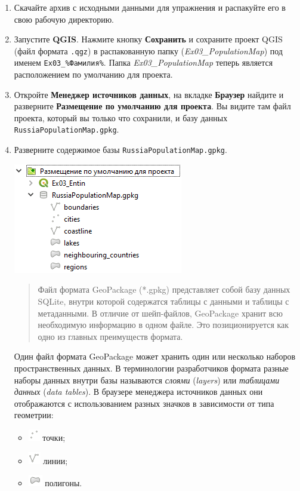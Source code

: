 \documentclass[
  12pt,
]{book}
\providecommand{\tightlist}{%
  \setlength{\itemsep}{0pt}\setlength{\parskip}{0pt}}
\begin{document}
\begin{enumerate}
\def\labelenumi{\arabic{enumi}.}
\item
  Скачайте архив с исходными данными для упражнения и распакуйте его в свою рабочую директорию.
\item
  Запустите \textbf{QGIS}. Нажмите кнопку \textbf{Сохранить} и сохраните проект QGIS (файл формата \texttt{.qgz}) в распакованную папку (\emph{Ex03\_PopulationMap}) под именем \texttt{Ex03\_\%Фамилия\%}. Папка \emph{Ex03\_PopulationMap} теперь является расположением по умолчанию для проекта.
\item
  Откройте \textbf{Менеджер источников данных}, на вкладке \textbf{Браузер} найдите и разверните \textbf{Размещение по умолчанию для проекта}. Вы видите там файл проекта, который вы только что сохранили, и базу данных \texttt{RussiaPopulationMap.gpkg}.
\item
  Разверните содержимое базы \texttt{RussiaPopulationMap.gpkg}.

  \includegraphics{images/Ex03/GeoPackageStructure.png}

  \begin{quote}
  Файл формата GeoPackage (*.gpkg) представляет собой базу данных SQLite, внутри которой содержатся таблицы с данными и таблицы с метаданными. В отличие от шейп-файлов, GeoPackage хранит всю необходимую информацию в одном файле. Это позиционируется как одно из главных преимуществ формата.
  \end{quote}

  Один файл формата GeoPackage может хранить один или несколько наборов пространственных данных. В терминологии разработчиков формата разные наборы данных внутри базы называются \emph{слоями} (\emph{layers}) или \emph{таблицами данных} (\emph{data tables}). В браузере менеджера источников данных они отображаются с использованием разных значков в зависимости от типа геометрии:

  \begin{itemize}
  \tightlist
  \item
    \includegraphics{images/Ex03/points.png} точки;
  \item
    \includegraphics{images/Ex03/polylines.png} линии;
  \item
    \includegraphics{images/Ex03/polygons.png} полигоны.
  \end{itemize}


\end{enumerate}
\end{document}
